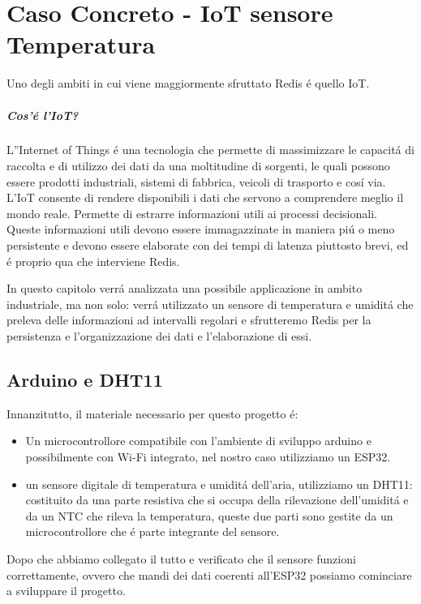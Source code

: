 \chapter{Caso Concreto - IoT sensore Temperatura}
Uno degli ambiti in cui viene maggiormente sfruttato Redis é quello IoT.
\paragraph{Cos'é l'IoT?\\}
L''Internet of Things é una tecnologia che permette di massimizzare le capacitá di raccolta e di utilizzo
dei dati da una moltitudine di sorgenti, le quali possono essere prodotti industriali, sistemi di fabbrica, veicoli
di trasporto e cosí via.
L'IoT consente di rendere disponibili i dati che servono a comprendere meglio il mondo reale.
Permette di estrarre informazioni utili ai processi decisionali.\\
Queste informazioni utili devono essere immagazzinate in maniera piú o meno persistente
e devono essere elaborate con dei tempi di latenza piuttosto brevi, ed é proprio qua che interviene Redis.

In questo capitolo verrá analizzata una possibile applicazione in ambito industriale, ma non solo:
verrá utilizzato un sensore di temperatura e umiditá che preleva delle informazioni ad intervalli regolari e
sfrutteremo Redis per la persistenza e l'organizzazione dei dati e l'elaborazione di essi.

\section{Arduino e DHT11}
Innanzitutto, il materiale necessario per questo progetto é:
\begin{itemize}
    \item Un microcontrollore compatibile con l'ambiente di sviluppo arduino e possibilmente con Wi-Fi integrato,
          nel nostro caso utilizziamo un ESP32.
    \item un sensore digitale di temperatura e umiditá dell'aria, utilizziamo un DHT11: costituito da una parte resistiva
    che si occupa della rilevazione dell'umiditá e da un NTC che rileva la temperatura, queste due parti sono gestite
    da un microcontrollore che é parte integrante del sensore.
\end{itemize}

Dopo che abbiamo collegato il tutto e verificato che il sensore funzioni correttamente, ovvero che mandi dei dati
coerenti all'ESP32 possiamo cominciare a sviluppare il progetto.

